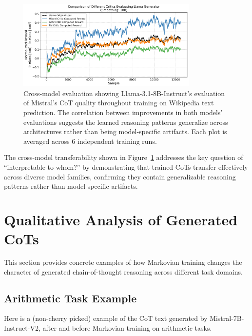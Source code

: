 \documentclass{article}
\begin{document}
\begin{figure}[ht]
    \centering
    \includegraphics[width=0.8\textwidth]{Figures/wiki_multi_critic_comparison.png}
    \caption{Cross-model evaluation showing Llama-3.1-8B-Instruct's evaluation of Mistral's CoT quality throughout training on Wikipedia text prediction. The correlation between improvements in both models' evaluations suggests the learned reasoning patterns generalize across architectures rather than being model-specific artifacts. Each plot is averaged across 6 independent training runs.}
    \label{fig:wiki_cross_model}
\end{figure}

The cross-model transferability shown in Figure~\ref{fig:wiki_cross_model} addresses the key question of ``interpretable to whom?'' by demonstrating that trained CoTs transfer effectively across diverse model families, confirming they contain generalizable reasoning patterns rather than model-specific artifacts.

\section{Qualitative Analysis of Generated CoTs}
This section provides concrete examples of how Markovian training changes the character of generated chain-of-thought reasoning across different task domains.

\subsection{Arithmetic Task Example}
Here is a (non-cherry picked) example of the CoT text generated by Mistral-7B-Instruct-V2, after and before Markovian training on arithmetic tasks.
\end{document}
